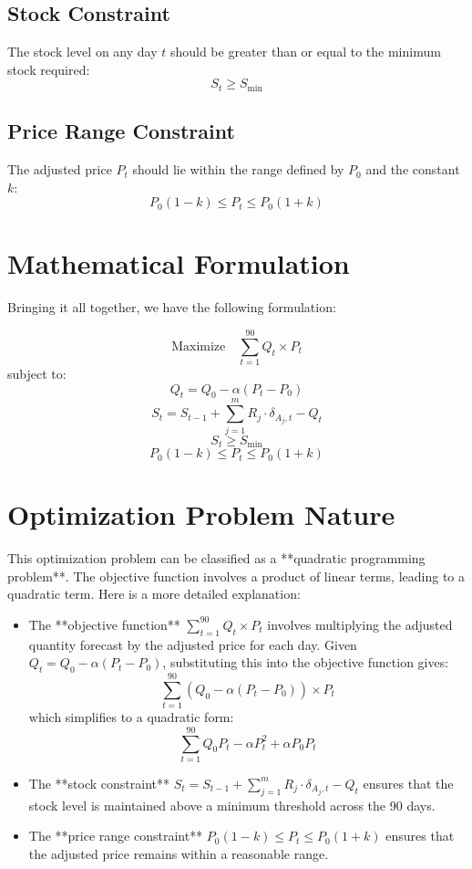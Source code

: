 \documentclass{article}
\begin{document}
\subsection*{Stock Constraint}

The stock level on any day \( t \) should be greater than or equal to the minimum stock required:
\[
S_t \geq S_{\text{min}}
\]

\subsection*{Price Range Constraint}

The adjusted price \( P_t \) should lie within the range defined by \( P_0 \) and the constant \( k \):
\[
P_0(1 - k) \leq P_t \leq P_0(1 + k)
\]

\section*{Mathematical Formulation}

Bringing it all together, we have the following formulation:

\[
\text{Maximize} \quad \sum_{t=1}^{90} Q_t \times P_t
\]
subject to:
\[
Q_t = Q_0 - \alpha (P_t - P_0)
\]
\[
S_t = S_{t-1} + \sum_{j=1}^{m} R_j \cdot \delta_{A_j,t} - Q_t
\]
\[
S_t \geq S_{\text{min}}
\]
\[
P_0(1 - k) \leq P_t \leq P_0(1 + k)
\]

\section*{Optimization Problem Nature}

This optimization problem can be classified as a **quadratic programming problem**. The objective function involves a product of linear terms, leading to a quadratic term. Here is a more detailed explanation:

\begin{itemize}
    \item The **objective function** \( \sum_{t=1}^{90} Q_t \times P_t \) involves multiplying the adjusted quantity forecast by the adjusted price for each day. Given \( Q_t = Q_0 - \alpha (P_t - P_0) \), substituting this into the objective function gives:
    \[
    \sum_{t=1}^{90} (Q_0 - \alpha (P_t - P_0)) \times P_t
    \]
    which simplifies to a quadratic form:
    \[
    \sum_{t=1}^{90} Q_0 P_t - \alpha P_t^2 + \alpha P_0 P_t
    \]
    \item The **stock constraint** \( S_t = S_{t-1} + \sum_{j=1}^{m} R_j \cdot \delta_{A_j,t} - Q_t \) ensures that the stock level is maintained above a minimum threshold across the 90 days.
    \item The **price range constraint** \( P_0(1 - k) \leq P_t \leq P_0(1 + k) \) ensures that the adjusted price remains within a reasonable range.
\end{itemize}
\end{document}
